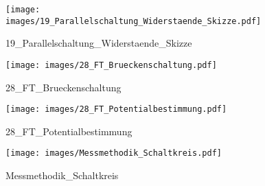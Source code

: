%
%
\begin{figure}[!hb]%
    \centering
  \texttt{[image: images/19\_Parallelschaltung\_Widerstaende\_Skizze.pdf]}%
  \caption{19_Parallelschaltung_Widerstaende_Skizze}%
\end{figure}

%
%
\begin{figure}[!hb]%
    \centering
  \texttt{[image: images/28\_FT\_Brueckenschaltung.pdf]}%
  \caption{28_FT_Brueckenschaltung}%
\end{figure}

%
%
\begin{figure}[!hb]%
    \centering
  \texttt{[image: images/28\_FT\_Potentialbestimmung.pdf]}%
  \caption{28_FT_Potentialbestimmung}%
\end{figure}

%
%
\begin{figure}[!hb]%
    \centering
  \texttt{[image: images/Messmethodik\_Schaltkreis.pdf]}%
  \caption{Messmethodik_Schaltkreis}%
\end{figure}

